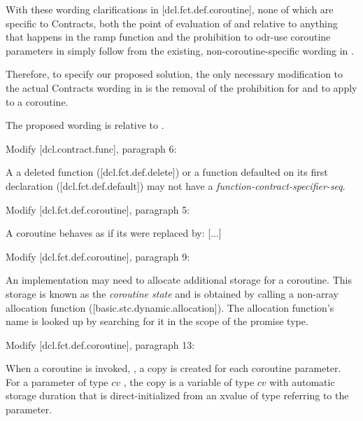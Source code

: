 With these wording clarifications in [dcl.fct.def.coroutine], none of which are specific to Contracts, both the point of evaluation of  and  relative to anything that happens in the ramp function and the prohibition to odr-use coroutine parameters in  simply follow from the existing, non-coroutine-specific wording in \cite{P2900R8}.

Therefore, to specify our proposed solution, the only necessary modification to the actual Contracts wording in \cite{P2900R8} is the removal of the prohibition  for  and  to apply to a coroutine.

The proposed wording is relative to \cite{P2900R8}.

Modify [dcl.contract.func], paragraph 6:
\begin{adjustwidth}{0.5cm}{0.5cm}
A a deleted function ([dcl.fct.def.delete])\removed{,} or a function defaulted on its first declaration ([dcl.fct.def.default]) may not have a \emph{function-contract-specifier-seq}.
\end{adjustwidth}

Modify [dcl.fct.def.coroutine], paragraph 5:

\begin{adjustwidth}{0.5cm}{0.5cm}
A coroutine behaves as if its  were replaced by: [...]
\end{adjustwidth}

Modify [dcl.fct.def.coroutine], paragraph 9:
\begin{adjustwidth}{0.5cm}{0.5cm}
An implementation may need to allocate additional storage for a coroutine. This storage is known as the \emph{coroutine state} and is obtained by calling a non-array allocation function ([basic.stc.dynamic.allocation]). The allocation function's name is looked up by searching for it in the scope of the promise type.
\end{adjustwidth}

Modify [dcl.fct.def.coroutine], paragraph 13:
\begin{adjustwidth}{0.5cm}{0.5cm}
When a coroutine is invoked, , a copy is created for each coroutine parameter. For a parameter of type $cv$ , the copy is a variable of type $cv$  with automatic storage duration that is direct-initialized from an xvalue of type  referring to the parameter.

\end{adjustwidth}

